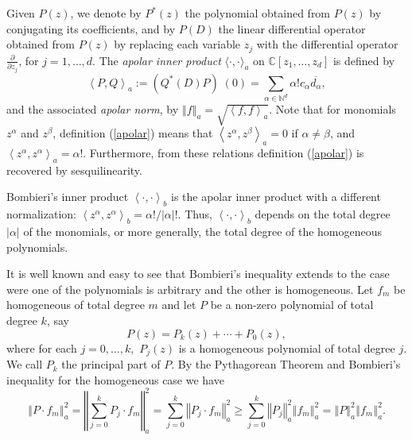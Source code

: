 \documentclass[12pt]{amsart}
\begin{document}
Given $P\left(  z\right)  $, we denote by
$P^{\ast}\left(  z\right)  $ the polynomial obtained from $P\left(  z\right)
$ by conjugating its coefficients, and by $P\left(  D\right)  $  the linear
differential operator obtained from $P\left(  z\right)
$ by replacing each variable $z_{j}$ with the
differential operator $\frac{\partial}{\partial z_{j}}$, for $j = 1, \dots ,d$.
The \emph{apolar inner product} $\langle  \cdot,\cdot\rangle_{a}$ on
$\mathbb{C}[z_{1},\dots,z_{d}]$ is defined by
\begin{equation}\label{apolar}
\left\langle P,Q\right\rangle_{a} :=\left( Q^*\left(
D\right)  P\right) \;(0)=\sum_{\alpha\in\mathbb{N}^{d}}\alpha!c_{\alpha
}\overline{d_{\alpha}},
\end{equation}
and the associated {\em apolar norm}, by
$
\left\Vert f\right\Vert _{a}=\sqrt{\left\langle f,f\right\rangle_{a}}.
$
Note that for monomials $z^\alpha$ and $z^\beta$, definition (\ref{apolar}) means that $\left\langle z^\alpha, z^\beta \right\rangle_{a} = 0$ if $\alpha \ne \beta$, and $\left\langle z^\alpha, z^\alpha \right\rangle_{a} = \alpha !$. Furthermore, from these relations definition (\ref{apolar}) is recovered by sesquilinearity.

Bombieri's inner product $\left\langle \cdot, \cdot \right\rangle_{b}$ is the apolar inner product  with a different normalization: $\left\langle z^\alpha, z^\alpha \right\rangle_{b} = \alpha !/|\alpha|!$. Thus, $\left\langle \cdot, \cdot \right\rangle_{b}$ depends on the total degree $|\alpha|$ of the monomials, or more generally, the total degree of the homogeneous polynomials.

 It is well known and easy to see that Bombieri's inequality extends to the case were one of the polynomials is arbitrary and the other is homogeneous. Let $f_m$ be homogeneous of total degree $m$ and let $P$ be a non-zero polynomial of total degree $k$, say 
\begin{equation*}
P\left( z \right) =P_{k}\left( z \right) +\cdots +P_{0}\left( z \right),
\end{equation*}
where for each $j=0, \dots ,k,$
 $P_{j}\left( z\right) $ is a homogeneous polynomial
of total degree $j$.  We call $P_k$ the principal part of $P$.
By the Pythagorean Theorem and Bombieri's inequality for the homogeneous case we have 
\[
\left\Vert P \cdot f_{m} \right\Vert _{a}^{2}
=
\left\Vert \sum_{j = 0}^k P_j\cdot f_m \right\Vert _{a}^{2}
=
\sum_{j = 0}^k  \left\Vert P_j\cdot f_m \right\Vert _{a}^{2}
\geq
\sum_{j = 0}^k  \left\Vert P_j \right\Vert _{a}^{2}  \left\Vert f_m \right\Vert _{a}^{2}
=
\left\Vert P \right\Vert _{a}^{2}  \left\Vert f_m \right\Vert _{a}^{2}.
\]
\end{document}
